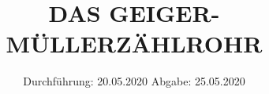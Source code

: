 

\subject{V703}
\title{DAS GEIGER-MÜLLERZÄHLROHR}
\date{%
  Durchführung: 20.05.2020
  \hspace{3em}
  Abgabe: 25.05.2020
}



\maketitle
\thispagestyle{empty}
\tableofcontents
\newpage







\printbibliography{}


